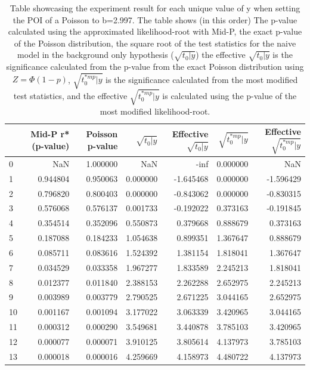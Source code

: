 \documentclass[14pt, a4paper]{article}  %
\begin{document}
\begin{table}[!ht]
    \centering
    \caption{Table showcasing the experiment result for each unique value of y when setting the POI of a Poisson to b=2.997. The table shows (in this order) The p-value calculated using the approximated likelihood-root with Mid-P, the exact p-value of the Poisson distribution, the square root of the test statistics for the naive model in the background only hypothesis ($\sqrt{t_0|y}$) the effective $\sqrt{t_0|y}$ is the significance calculated from the p-value from the exact Poisson distribution using $Z = \Phi(1-p)$, $\sqrt{t_0^{*mp}|y}$ is the significance calculated from the most modified test statistics, and the effective $\sqrt{t_0^{*mp}|y}$ is calculated using the p-value of the most modified likelihood-root.}
    \begin{tabular}{lrrrrrr}
    \toprule
     & Mid-P r* (p-value) & Poisson p-value & $\sqrt{t_0\vert y}$ & Effective $\sqrt{t_0\vert y}$ & $\sqrt{t_0^{*mp}\vert y}$ & Effective $\sqrt{t_0^{*mp}\vert y}$ \\
    \midrule
    0 & NaN & 1.000000 & NaN & -inf & 0.000000 & NaN \\
    1 & 0.944804 & 0.950063 & 0.000000 & -1.645468 & 0.000000 & -1.596429 \\
    2 & 0.796820 & 0.800403 & 0.000000 & -0.843062 & 0.000000 & -0.830315 \\
    3 & 0.576068 & 0.576137 & 0.001733 & -0.192022 & 0.373163 & -0.191845 \\
    4 & 0.354514 & 0.352096 & 0.550873 & 0.379668 & 0.888679 & 0.373163 \\
    5 & 0.187088 & 0.184233 & 1.054638 & 0.899351 & 1.367647 & 0.888679 \\
    6 & 0.085711 & 0.083616 & 1.524392 & 1.381154 & 1.818041 & 1.367647 \\
    7 & 0.034529 & 0.033358 & 1.967277 & 1.833589 & 2.245213 & 1.818041 \\
    8 & 0.012377 & 0.011840 & 2.388153 & 2.262288 & 2.652975 & 2.245213 \\
    9 & 0.003989 & 0.003779 & 2.790525 & 2.671225 & 3.044165 & 2.652975 \\
    10 & 0.001167 & 0.001094 & 3.177022 & 3.063339 & 3.420965 & 3.044165 \\
    11 & 0.000312 & 0.000290 & 3.549681 & 3.440878 & 3.785103 & 3.420965 \\
    12 & 0.000077 & 0.000071 & 3.910125 & 3.805614 & 4.137973 & 3.785103 \\
    13 & 0.000018 & 0.000016 & 4.259669 & 4.158973 & 4.480722 & 4.137973 \\
    \bottomrule
    \end{tabular}
\end{table}
\end{document}
